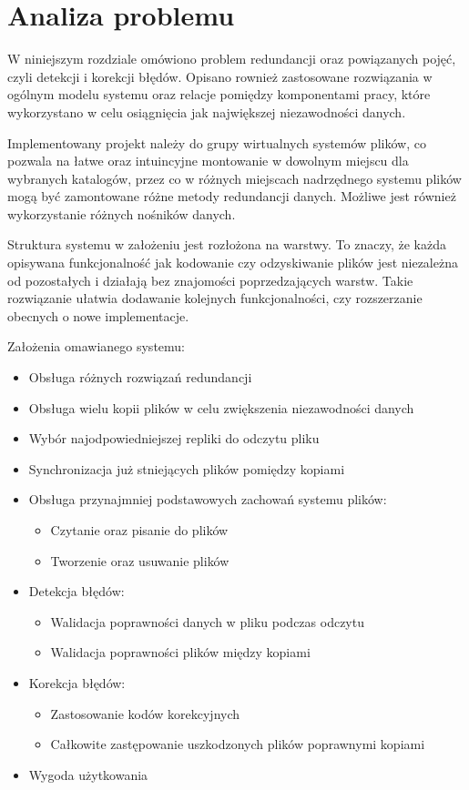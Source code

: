\chapter{Analiza problemu}
\thispagestyle{chapterBeginStyle}
\label{rozdzial1}
W niniejszym rozdziale omówiono problem redundancji oraz powiązanych pojęć, czyli detekcji i korekcji błędów. Opisano rownież zastosowane rozwiązania w ogólnym modelu systemu oraz relacje pomiędzy komponentami pracy, które wykorzystano w celu osiągnięcia jak największej niezawodności danych.

Implementowany projekt należy do grupy wirtualnych systemów plików, co pozwala na łatwe oraz intuincyjne montowanie w dowolnym miejscu dla wybranych katalogów, przez co w różnych miejscach nadrzędnego systemu plików mogą być zamontowane różne metody redundancji danych. Możliwe jest również wykorzystanie różnych nośników danych. 

Struktura systemu w założeniu jest rozłożona na warstwy. To znaczy, że każda opisywana funkcjonalność jak kodowanie czy odzyskiwanie plików jest niezależna od pozostałych i działają bez znajomości poprzedzających warstw. Takie rozwiązanie ułatwia dodawanie kolejnych funkcjonalności, czy rozszerzanie obecnych o nowe implementacje.

Założenia omawianego systemu:
\begin{itemize}
    \item Obsługa różnych rozwiązań redundancji
    \item Obsługa wielu kopii plików w celu zwiększenia niezawodności danych
    \item Wybór najodpowiedniejszej repliki do odczytu pliku 
    \item Synchronizacja już stniejących plików pomiędzy kopiami
	\item Obsługa przynajmniej podstawowych zachowań systemu plików:
		\begin{itemize}
			\item Czytanie oraz pisanie do plików
			\item Tworzenie oraz usuwanie plików
		\end{itemize}
	\item Detekcja błędów:
		\begin{itemize}
			\item Walidacja poprawności danych w pliku podczas odczytu
			\item Walidacja poprawności plików między kopiami 
		\end{itemize}
	\item Korekcja błędów:
		\begin{itemize}
			\item Zastosowanie kodów korekcyjnych
			\item Całkowite zastępowanie uszkodzonych plików poprawnymi kopiami
		\end{itemize}
    \item Wygoda użytkowania
\end{itemize}

